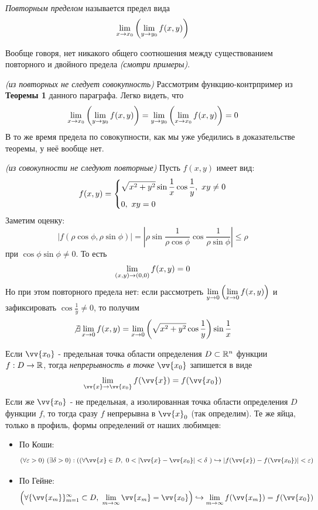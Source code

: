 \begin{definition}
	\textit{Повторным пределом} называется предел вида
	\[
		\lim\limits_{x \to x_0} \left(\lim\limits_{y \to y_0} f(x, y)\right)
	\]
\end{definition}

\begin{note}
	Вообще говоря, нет никакого общего соотношения между существованием повторного и двойного предела \textit{(смотри примеры)}.
\end{note}

\begin{example} 
	\textit{(из повторных не следует совокупность)}
	Рассмотрим функцию-контрпример из \textbf{Теоремы 1} данного параграфа. Легко видеть, что
	\[
		\lim\limits_{x \to x_0} \left(\lim\limits_{y \to y_0} f(x, y)\right) = \lim\limits_{y \to y_0} \left(\lim\limits_{x \to x_0} f(x, y)\right) = 0
	\]
	В то же время предела по совокупности, как мы уже убедились в доказательстве теоремы, у неё вообще нет.
\end{example}

\begin{example} 
	\textit{(из совокупности не следуют повторные)}
	Пусть $f(x, y)$ имеет вид:
	\[
		f(x, y) = \System{
			&{\sqrt{x^2 + y^2} \sin \frac{1}{x} \cos \frac{1}{y}},\ xy \neq 0
			\\
			&{0,\ xy = 0}
		}
	\]
	Заметим оценку:
	\[
		|f(\rho\cos\phi, \rho\sin\phi)| =  \left|\rho\sin\frac{1}{\rho\cos\phi}\cos\frac{1}{\rho\sin\phi}\right| \le \rho
	\]
	при $\cos\phi\sin\phi \neq 0$. То есть
	\[
		\lim\limits_{(x, y) \to (0, 0)} f(x, y) = 0
	\]
	Но при этом повторного предела нет: если рассмотреть $\lim\limits_{y \to 0} \left(\lim\limits_{x \to 0} f(x, y)\right)$ и зафиксировать $\cos \frac{1}{y} \neq 0$, то получим
	\[
		\not\exists \lim\limits_{x \to 0} f(x, y) = \lim\limits_{x \to 0} \left(\sqrt{x^2 + y^2} \cos\frac{1}{y}\right)\sin\frac{1}{x}
	\]
\end{example}

\begin{definition}
	Если $\vv{x_0}$ - предельная точка области определения $D \subset \mathbb{R}^n$ функции $f: D \to \mathbb{R}$, тогда \textit{непрерывность в точке} $\vv{x_0}$ запишется в виде
	\[
		\liml_{\vv{x} \to \vv{x_0}} f(\vv{x}) = f(\vv{x_0})
	\]
	Если же $\vv{x_0}$ - не предельная, а изолированная точка области определения $D$ функции $f$, то тогда сразу $f$ непрерывна в $\vv{x}_0$ (так определим).
	Те же яйца, только в профиль, формы определений от наших любимцев:
	\begin{itemize}
		\item По Коши:
		\[
		(\forall \eps > 0)\ (\exists \delta > 0) : ( (\forall \vv{x} \in D,\ 0 < |\vv{x} - \vv{x_0}| < \delta\ )\hookrightarrow |f(\vv{x}) -f(\vv{x_0})| < \eps)
		\]
		
		\item По Гейне:
		\[
		\left(\forall \{\vv{x_m}\}_{m = 1}^\infty \subset D ,\ \liml_{m \to \infty} \vv{x_m} = \vv{x_0}\right) \hookrightarrow \liml_{m \to \infty} f(\vv{x_m}) = f(\vv{x_0})
		\]
	\end{itemize}
\end{definition}

